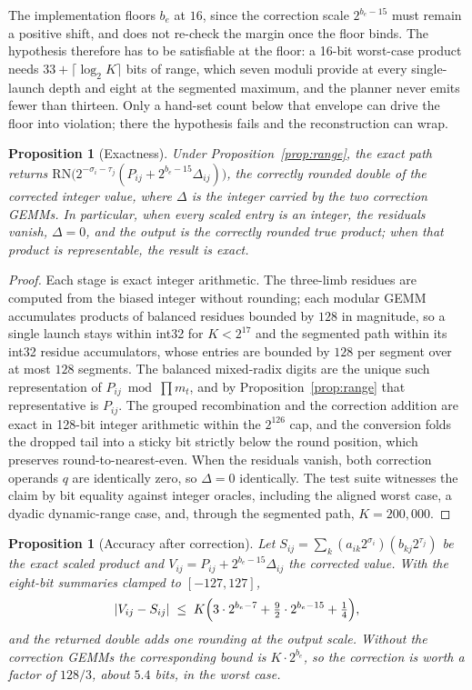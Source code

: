 \documentclass[11pt]{amsart}
\theoremstyle{plain}
\newtheorem{proposition}[theorem]{Proposition}
\theoremstyle{definition}
\begin{document}
The implementation floors $b_e$ at $16$, since the correction scale
$2^{b_e - 15}$ must remain a positive shift, and does not re-check the
margin once the floor binds. The hypothesis therefore has to be
satisfiable at the floor: a 16-bit worst-case product needs
$33 + \lceil \log_2 K \rceil$ bits of range, which seven moduli provide
at every single-launch depth and eight at the segmented maximum, and the
planner never emits fewer than thirteen. Only a hand-set count below
that envelope can drive the floor into violation; there the hypothesis
fails and the reconstruction can wrap.

\begin{proposition}[Exactness]\label{prop:exact}
Under Proposition~\ref{prop:range}, the exact path returns
$\mathrm{RN}\bigl(2^{-\sigma_i - \tau_j} (P_{ij} + 2^{b_e - 15}
\Delta_{ij})\bigr)$, the correctly rounded double of the corrected
integer value, where $\Delta$ is the integer carried by the two
correction GEMMs. In particular, when every scaled entry is an integer,
the residuals vanish, $\Delta = 0$, and the output is the correctly
rounded true product; when that product is representable, the result is
exact.
\end{proposition}

\begin{proof}
Each stage is exact integer arithmetic. The three-limb residues are
computed from the biased integer without rounding; each modular GEMM
accumulates products of balanced residues bounded by $128$ in magnitude,
so a single launch stays within int32 for $K < 2^{17}$ and the segmented
path within its int32 residue accumulators, whose entries are bounded by
$128$ per segment over at most $128$ segments. The balanced mixed-radix
digits are the unique such representation of $P_{ij} \bmod \prod m_t$,
and by Proposition~\ref{prop:range} that representative is $P_{ij}$. The
grouped recombination and the correction addition are exact in 128-bit
integer arithmetic within the $2^{126}$ cap, and the conversion folds the
dropped tail into a sticky bit strictly below the round position, which
preserves round-to-nearest-even. When the residuals vanish, both
correction operands $q$ are identically zero, so $\Delta = 0$
identically. The test suite witnesses the claim by bit equality against
integer oracles, including the aligned worst case, a dyadic
dynamic-range case, and, through the segmented path, $K = 200{,}000$.
\end{proof}

\begin{proposition}[Accuracy after correction]\label{prop:accuracy}
Let $S_{ij} = \sum_k (a_{ik} 2^{\sigma_i}) (b_{kj} 2^{\tau_j})$ be the
exact scaled product and $V_{ij} = P_{ij} + 2^{b_e-15} \Delta_{ij}$ the
corrected value. With the eight-bit summaries clamped to $[-127, 127]$,
\[
  |V_{ij} - S_{ij}|
  \;\le\; K \Bigl( 3 \cdot 2^{b_e - 7} + \tfrac92 \cdot 2^{b_e - 15}
  + \tfrac14 \Bigr),
\]
and the returned double adds one rounding at the output scale. Without
the correction GEMMs the corresponding bound is $K \cdot 2^{b_e}$, so
the correction is worth a factor of $128/3$, about $5.4$ bits, in the
worst case.
\end{proposition}
\end{document}

